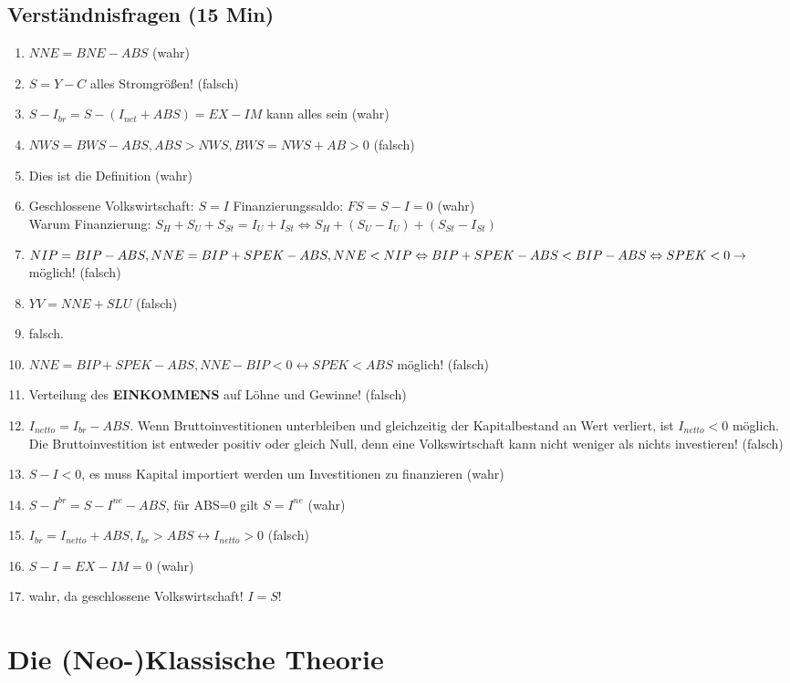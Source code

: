 \documentclass{scrartcl}
\begin{document}
\subsection{Verst\"{a}ndnisfragen (15 Min)}
\begin{enumerate}
  \item $NNE=BNE - ABS$ (wahr)
  \item $S=Y-C$ alles Stromgr\"{o}{\ss}en! (falsch)
  \item $S-I_{br} =S-(I_{net}+ABS)= EX-IM$ kann alles sein (wahr)
  \item $NWS = BWS -ABS, ABS>NWS, BWS = NWS + AB >0$ (falsch)
  \item Dies ist die Definition (wahr)
  \item Geschlossene Volkswirtschaft: $S=I$ Finanzierungssaldo: $FS=S-I = 0$ (wahr)\\
  Warum Finanzierung: $S_H + S_U + S_{St} = I_{U}+I_{St} \Leftrightarrow S_H + (S_U-I_U)+(S_{St}-I_{St})$
  \item $NIP = BIP-ABS, NNE = BIP + SPEK -ABS,\\ NNE < NIP \Leftrightarrow BIP +SPEK - ABS < BIP -ABS \Leftrightarrow SPEK < 0 \rightarrow $ m\"{o}glich! (falsch)
  \item $YV = NNE + SLU$ (falsch)
  \item falsch.
  \item $NNE=BIP+SPEK-ABS, NNE-BIP<0 \leftrightarrow SPEK < ABS$ m\"{o}glich! (falsch)
  \item Verteilung des \textbf{EINKOMMENS} auf L\"{o}hne und Gewinne! (falsch)
  \item $I_{netto} = I_{br} - ABS$. Wenn Bruttoinvestitionen unterbleiben und gleichzeitig der Kapitalbestand an Wert verliert, ist $I_{netto}<0$ m\"{o}glich. Die Bruttoinvestition ist entweder positiv oder gleich Null, denn eine Volkswirtschaft kann nicht weniger als nichts investieren! (falsch)
  \item $S-I<0$, es muss Kapital importiert werden um Investitionen zu finanzieren (wahr)
  \item $S-I^{br} = S - I^{ne} -ABS$, f\"{u}r ABS=0 gilt $S=I^{ne}$ (wahr)
  \item $I_{br} = I_{netto} + ABS, I_{br} > ABS \leftrightarrow I_{netto} > 0$ (falsch)
  \item $S-I = EX-IM = 0$ (wahr)
  \item wahr, da geschlossene Volkswirtschaft! $I=S$!
\end{enumerate}

\section{Die (Neo-)Klassische Theorie}
\end{document}
